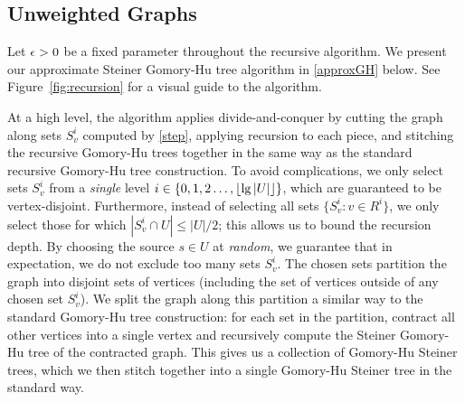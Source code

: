 \subsection{Unweighted Graphs}

Let $\epsilon>0$ be a fixed parameter throughout the recursive algorithm. We present our approximate Steiner Gomory-Hu tree algorithm in \ref{approxGH} below.
See Figure~\ref{fig:recursion} for a visual guide to the algorithm.

At a high level, the algorithm applies divide-and-conquer by cutting the graph along sets $S^i_v$ computed by \ref{step}, applying recursion to each piece, and stitching the recursive Gomory-Hu trees together in the same way as the standard recursive Gomory-Hu tree construction. To avoid complications, we only select sets $S^i_v$ from a \emph{single} level $i\in\{0,1,2\ldots,\lfloor\lg|U|\rfloor\}$, which are guaranteed to be vertex-disjoint. Furthermore, instead of selecting all sets $\{S^i_v:v\in R^i\}$, we only select those for which $|S^i_v\cap U|\le|U|/2$; this allows us to bound the recursion depth. By choosing the source $s\in U$ at \emph{random}, we guarantee that in expectation, we do not exclude too many sets $S^i_v$. The chosen sets partition the graph into disjoint sets of vertices (including the set of vertices outside of any chosen set $S^i_v$). We split the graph along this partition a similar way to the standard Gomory-Hu tree construction: for each set in the partition, contract all other vertices into a single vertex and recursively compute the Steiner Gomory-Hu tree of the contracted graph. This gives us a collection of Gomory-Hu Steiner trees, which we then stitch together into a single Gomory-Hu Steiner tree in the standard way.





